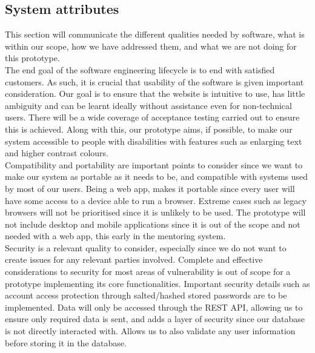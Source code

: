 \documentclass[10pt]{article}
\begin{document}
\subsection{System attributes}
This section will communicate the different qualities needed by software, what
is within our scope, how we have addressed them, and what we are not doing for
this prototype.\\ The end goal of the software engineering lifecycle is to end
with satisfied customers. As such, it is crucial that usability of the software
is given important consideration. Our goal is to ensure that the website is
intuitive to use, has little ambiguity and can be learnt ideally without
assistance even for non-technical users. There will be a wide coverage of
acceptance testing carried out to ensure this is achieved. Along with this, our
prototype aims, if possible, to make our system accessible to people with
disabilities with features such as enlarging text and higher contrast colours.
\\Compatibility and portability are important points to consider since we want to
make our system as portable as it needs to be, and compatible with systems used
by most of our users. Being a web app, makes it portable since every user will
have some access to a device able to run a browser. Extreme cases such as legacy
browsers will not be prioritised since it is unlikely to be used. The prototype
will not include desktop and mobile applications since it is out of the scope
and not needed with a web app, this early in the mentoring system. \\Security is a
relevant quality to consider, especially since we do not want to create issues
for any relevant parties involved. Complete and effective considerations to
security for most areas of vulnerability is out of scope for a prototype
implementing its core functionalities. Important security details such as
account access protection through salted/hashed stored passwords are to be
implemented. Data will only be accessed through the REST API, allowing us to
ensure only required data is sent, and adds a layer of security since our
database is not directly interacted with. Allows us to also validate any user
information before storing it in the database.
\end{document}

